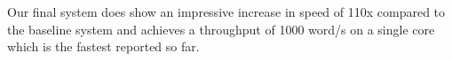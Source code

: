 \documentclass[11pt,a4paper]{article}
\begin{document}
Our final system does show an impressive increase in speed of 110x compared to the baseline system and achieves a throughput of 1000 word/s on a single core which is the fastest reported so far.

\newpage

%

%
%


\end{document}
